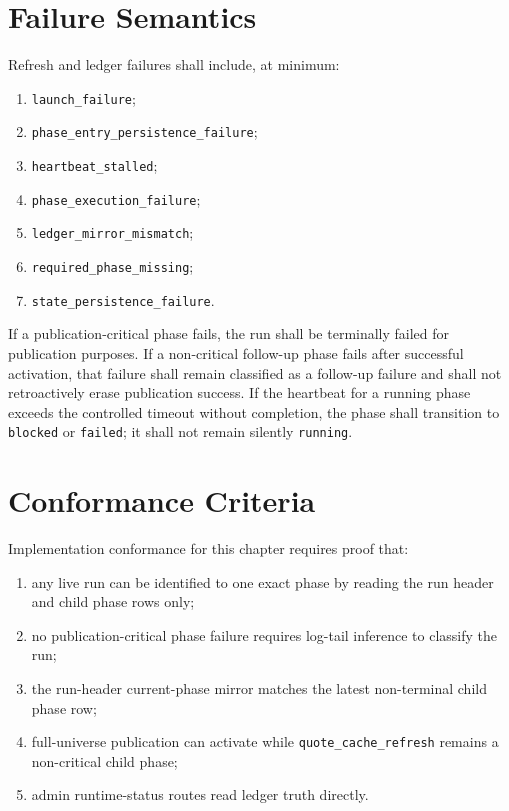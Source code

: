 \documentclass[11pt]{report}
\begin{document}
\section{Failure Semantics}
Refresh and ledger failures shall include, at minimum:
\begin{enumerate}[leftmargin=1.2cm]
    \item \texttt{launch\_failure};
    \item \texttt{phase\_entry\_persistence\_failure};
    \item \texttt{heartbeat\_stalled};
    \item \texttt{phase\_execution\_failure};
    \item \texttt{ledger\_mirror\_mismatch};
    \item \texttt{required\_phase\_missing};
    \item \texttt{state\_persistence\_failure}.
\end{enumerate}

If a publication-critical phase fails, the run shall be terminally failed for publication purposes. If a non-critical follow-up phase fails after successful activation, that failure shall remain classified as a follow-up failure and shall not retroactively erase publication success. If the heartbeat for a running phase exceeds the controlled timeout without completion, the phase shall transition to \texttt{blocked} or \texttt{failed}; it shall not remain silently \texttt{running}.

\section{Conformance Criteria}
Implementation conformance for this chapter requires proof that:
\begin{enumerate}[leftmargin=1.2cm]
    \item any live run can be identified to one exact phase by reading the run header and child phase rows only;
    \item no publication-critical phase failure requires log-tail inference to classify the run;
    \item the run-header current-phase mirror matches the latest non-terminal child phase row;
    \item full-universe publication can activate while \texttt{quote\_cache\_refresh} remains a non-critical child phase;
    \item admin runtime-status routes read ledger truth directly.
\end{enumerate}
\end{document}
